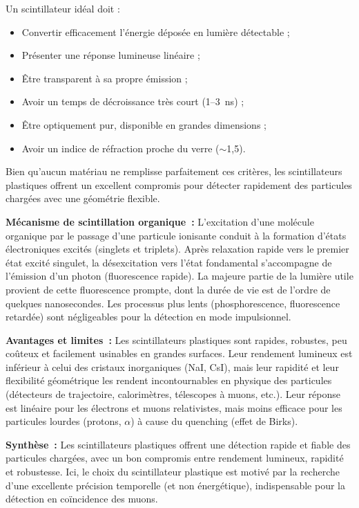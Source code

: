 \documentclass[a4paper,12pt,twoside]{article}
\begin{document}
Un scintillateur idéal doit :
\begin{itemize}
    \item Convertir efficacement l'énergie déposée en lumière détectable ;
    \item Présenter une réponse lumineuse linéaire ;
    \item Être transparent à sa propre émission ;
    \item Avoir un temps de décroissance très court (1--3~ns) ;
    \item Être optiquement pur, disponible en grandes dimensions ;
    \item Avoir un indice de réfraction proche du verre ($\sim$1,5).
\end{itemize}
Bien qu'aucun matériau ne remplisse parfaitement ces critères, les scintillateurs plastiques offrent un excellent compromis pour détecter rapidement des particules chargées avec une géométrie flexible.

\textbf{Mécanisme de scintillation organique~:} L'excitation d'une molécule organique par le passage d'une particule ionisante conduit à la formation d'états électroniques excités (singlets et triplets). Après relaxation rapide vers le premier état excité singulet, la désexcitation vers l'état fondamental s'accompagne de l'émission d'un photon (fluorescence rapide). La majeure partie de la lumière utile provient de cette fluorescence prompte, dont la durée de vie est de l'ordre de quelques nanosecondes. Les processus plus lents (phosphorescence, fluorescence retardée) sont négligeables pour la détection en mode impulsionnel.

\textbf{Avantages et limites~:} Les scintillateurs plastiques sont rapides, robustes, peu coûteux et facilement usinables en grandes surfaces. Leur rendement lumineux est inférieur à celui des cristaux inorganiques (NaI, CsI), mais leur rapidité et leur flexibilité géométrique les rendent incontournables en physique des particules (détecteurs de trajectoire, calorimètres, télescopes à muons, etc.). Leur réponse est linéaire pour les électrons et muons relativistes, mais moins efficace pour les particules lourdes (protons, $\alpha$) à cause du quenching (effet de Birks).

\begin{remarque}
\textbf{Synthèse~:} Les scintillateurs plastiques offrent une détection rapide et fiable des particules chargées, avec un bon compromis entre rendement lumineux, rapidité et robustesse. Ici, le choix du scintillateur plastique est motivé par la recherche d’une excellente précision temporelle (et non énergétique), indispensable pour la détection en coïncidence des muons.
\end{remarque}
\end{document}
